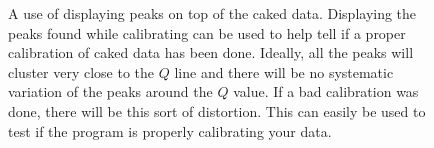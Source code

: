 \begin{figure}
    \caption{A use of displaying peaks on top of the caked 
    data. Displaying the peaks found while calibrating can 
    be used to help tell if a proper calibration of caked 
    data has been done. Ideally, all the peaks will cluster 
    very close to the $Q$ line and there will be no systematic 
    variation of the peaks around the $Q$ value. If a bad 
    calibration was done, there will be this sort of
    distortion. This can easily be used to test if the
    program is properly calibrating your data.}
\label{calibration_cake}
\end{figure}

